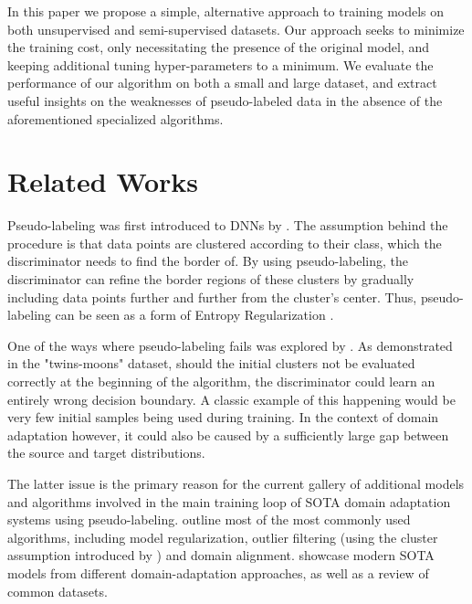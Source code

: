 \documentclass{article}
\begin{document}
	In this paper we propose a simple, alternative approach to training models on both unsupervised and semi-supervised datasets. Our approach seeks to minimize the training cost, only necessitating the presence of the original model, and keeping additional tuning hyper-parameters to a minimum. We evaluate the performance of our algorithm on both a small and large dataset, and extract useful insights on the weaknesses of pseudo-labeled data in the absence of the aforementioned specialized algorithms.
	
	
	\section{Related Works}
	
	Pseudo-labeling was first introduced to DNNs by \cite{pseudo-label-original}. The assumption behind the procedure is that data points are clustered according to their class, which the discriminator needs to find the border of. By using pseudo-labeling, the discriminator can refine the border regions of these clusters by gradually including data points further and further from the cluster's center. Thus, pseudo-labeling can be seen as a form of Entropy Regularization \cite{entropy-regularization}.
	
	One of the ways where pseudo-labeling fails was explored by \cite{pseudo-label-evaluation}. As demonstrated in the "twins-moons" dataset, should the initial clusters not be evaluated correctly at the beginning of the algorithm, the discriminator could learn an entirely wrong decision boundary. A classic example of this happening would be very few initial samples being used during training. In the context of domain adaptation however, it could also be caused by a sufficiently large gap between the source and target distributions.
	
	The latter issue is the primary reason for the current gallery of additional models and algorithms involved in the main training loop of SOTA domain adaptation systems using pseudo-labeling. \cite{good-practices} outline most of the most commonly used algorithms, including model regularization, outlier filtering (using the cluster assumption introduced by \cite{pseudo-label-original}) and domain alignment. \cite{model-survey} showcase modern SOTA models from different domain-adaptation approaches, as well as a review of common datasets.
	
\end{document}
